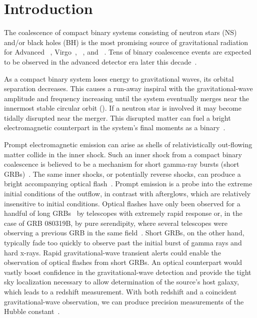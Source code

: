 \section{Introduction}
\label{sec:introduction}


The coalescence of compact binary systems consisting of neutron stars (NS)
and/or black holes (BH) is the most promising source of gravitational radiation
for Advanced \LIGO~\cite{ALIGOWeb}, Virgo~\cite{AVirgoWeb}, \GEO~\cite{GEOWeb},
and \LCGT~\cite{LCGTWeb}.  Tens of binary coalescence events are expected to be
observed in the advanced detector era later this
decade~\cite{Abadie:2010p10836}.

As a compact binary system loses energy to gravitational waves, its orbital
separation decreases. This causes a run-away inspiral with the
gravitational-wave amplitude and frequency increasing until the system
eventually merges near the innermost stable circular orbit (\ISCO).  If a
neutron star is involved it may become tidally disrupted near the merger.  This
disrupted matter can fuel a bright electromagnetic counterpart in the system's
final moments as a binary~\cite{shibata:2007}.

Prompt electromagnetic emission can arise as shells of relativistically
out-flowing matter collide in the inner shock. Such an inner shock from a
compact binary coalescence is believed to be a mechanism for short gamma-ray
bursts (short GRBs)~\cite{Lee:2005, nakar07}. The same inner shocks, or
potentially reverse shocks, can produce a bright accompanying optical flash~\cite{Sari99}. Prompt emission is a probe into the extreme
initial conditions of the outflow, in contrast with afterglows, which are
relatively insensitive to initial conditions. Optical flashes
have only been observed for a handful of long
GRBs~\cite{1999Natur.398..400A,2003Natur.422..284F,2006A&A...454L.119J,0004-637X-660-1-489,2008Natur.455..183R,2011A&A...528A..15G}
by telescopes with extremely rapid response or, in the case of GRB 080319B, by
pure serendipity, where several telescopes were observing a previous GRB in the
same field~\cite{2008Natur.455..183R}. Short GRBs, on the other hand, typically
fade too quickly to observe past the initial burst of gamma rays and hard
x-rays. Rapid gravitational-wave transient alerts could enable the observation
of optical flashes from short GRBs. An optical counterpart would vastly boost
confidence in the gravitational-wave detection and provide the tight sky
localization necessary to allow determination of the source's host galaxy,
which leads to a redshift measurement. With both redshift and a coincident
gravitational-wave observation, we can produce precision measurements of the
Hubble constant~\cite{2010ApJ...725..496N}.

